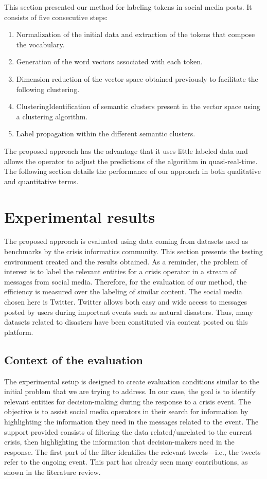 This section presented our method for labeling tokens in social media posts.
It consists of five consecutive steps:
\begin{enumerate}
    \item Normalization of the initial data and extraction of the tokens that compose the vocabulary.
    \item Generation of the word vectors associated with each token.
    \item Dimension reduction of the vector space obtained previously to facilitate the following clustering.
    \item ClusteringIdentification of semantic clusters present in the vector space using a clustering algorithm.
    \item Label propagation within the different semantic clusters.
\end{enumerate}
The proposed approach has the advantage that it uses little labeled data and allows the
operator to adjust the predictions of the algorithm in quasi-real-time.
The following section details the performance of our approach in both qualitative and quantitative terms.

\section{Experimental results}
The proposed approach is evaluated using data coming from datasets used as benchmarks
by the crisis informatics community.
This section presents the testing environment created and the results obtained.
As a reminder, the problem of interest is to label the relevant entities for a crisis operator in a stream of messages from social media.
Therefore, for the evaluation of our method, the efficiency is measured over the labeling of similar content.
The social media chosen here is Twitter.
Twitter allows both easy and wide access to messages posted by users during important events such as natural disasters.
Thus, many datasets related to disasters have been constituted via content posted on this platform.

\subsection{Context of the evaluation}
The experimental setup is designed to create evaluation conditions similar to the initial problem that we are trying to address.
In our case, the goal is to identify relevant entities for decision-making during the response to a crisis event.
The objective is to assist social media operators in their search for information by highlighting the information they need in the messages related to the event.
The support provided consists of filtering the data related/unrelated to the current crisis, then highlighting the information that decision-makers need in the response.
The first part of the filter identifies the relevant tweets—i.e., the tweets refer to the ongoing event.
This part has already seen many contributions, as shown in the literature review.

